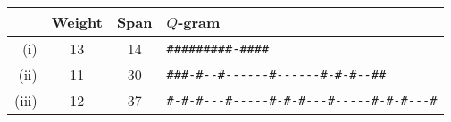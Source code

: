 \begin{tabular}{rccl}
\toprule
		& Weight & Span & $Q$-gram\\
\midrule
(i) 			& 13 			& 14			& \texttt{\#\#\#\#\#\#\#\#\#{-}\#\#\#\#} \\
(ii)			& 11 			& 30			& \texttt{\#\#\#{-}\#{-}{-}\#{-}{-}{-}{-}{-}{-}\#{-}{-}{-}{-}{-}{-}\#{-}\#{-}\#{-}{-}\#\#} \\
(iii)	& 12	& 37	& \texttt{\#{-}\#{-}\#{-}{-}{-}\#{-}{-}{-}{-}{-}\#{-}\#{-}\#{-}{-}{-}\#{-}{-}{-}{-}{-}\#{-}\#{-}\#{-}{-}{-}\#} \\
\bottomrule
\end{tabular}
